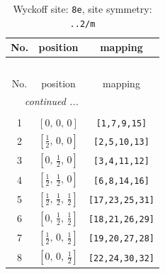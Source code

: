 \documentclass[fleqn,8pt]{jsarticle}
\begin{document}
\renewcommand{\arraystretch}{1.2}
\begin{longtable}{ccc}
\caption{Wyckoff site: {\tt 8e}, site symmetry: {\tt ..2/m}}
 \\
 \hline \hline
No. & position & mapping \\ \hline \endfirsthead

\multicolumn{2}{l}{\tablename\ \thetable{}} \\
 \hline \hline
No. & position & mapping \\ \hline \endhead

 \hline \hline
\multicolumn{2}{r}{\footnotesize\it continued ...} \\ \endfoot

 \hline \hline
\multicolumn{2}{r}{} \\ \endlastfoot

1 & $\left[ 0,\, 0,\, 0 \right]$ & {\tt [1,7,9,15]} \\ \hline
2 & $\left[ \frac{1}{2},\, 0,\, 0 \right]$ & {\tt [2,5,10,13]} \\ \hline
3 & $\left[ 0,\, \frac{1}{2},\, 0 \right]$ & {\tt [3,4,11,12]} \\ \hline
4 & $\left[ \frac{1}{2},\, \frac{1}{2},\, 0 \right]$ & {\tt [6,8,14,16]} \\ \hline
5 & $\left[ \frac{1}{2},\, \frac{1}{2},\, \frac{1}{2} \right]$ & {\tt [17,23,25,31]} \\ \hline
6 & $\left[ 0,\, \frac{1}{2},\, \frac{1}{2} \right]$ & {\tt [18,21,26,29]} \\ \hline
7 & $\left[ \frac{1}{2},\, 0,\, \frac{1}{2} \right]$ & {\tt [19,20,27,28]} \\ \hline
8 & $\left[ 0,\, 0,\, \frac{1}{2} \right]$ & {\tt [22,24,30,32]} \\
\end{longtable}
\renewcommand{\arraystretch}{1.2}
\end{document}
